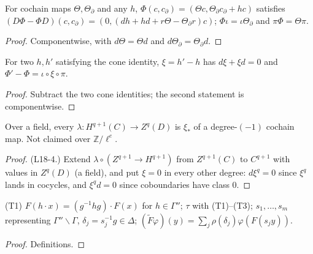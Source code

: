 \begin{lemma}\label{lem:conesign}
  \leanok
  For cochain maps $\Theta,\Theta_\partial$ and any $h$, $\Phi(c,c_\partial)=(\Theta c,\Theta_\partial c_\partial+hc)$ satisfies
  $(D\Phi-\Phi D)(c,c_\partial)=(0,(dh+hd+r\Theta-\Theta_\partial r)c)$; $\Phi\iota=\iota\Theta_\partial$ and $\pi\Phi=\Theta\pi$.
\end{lemma}
\begin{proof}
  \leanok
  Componentwise, with $d\Theta=\Theta d$ and $d\Theta_\partial=\Theta_\partial d$.
\end{proof}

\begin{proposition}\label{prop:coneambiguity}
  \leanok
  For two $h,h'$ satisfying the cone identity, $\xi=h'-h$ has $d\xi+\xi d=0$ and $\Phi'-\Phi=\iota\circ\xi\circ\pi$.
\end{proposition}
\begin{proof}
  \leanok
  Subtract the two cone identities; the second statement is componentwise.
\end{proof}

\begin{proposition}\label{prop:coneambiguity-realise}
  \leanok
  Over a field, every $\lambda\colon H^{q+1}(C)\to Z^q(D)$ is $\xi_*$ of a degree-$(-1)$ cochain map. Not claimed over
  $\mathbb Z/\ell^e$.
\end{proposition}
\begin{proof}
  \leanok
  (L18-4.) Extend $\lambda\circ(Z^{q+1}\to H^{q+1})$ from $Z^{q+1}(C)$ to $C^{q+1}$ with values in $Z^q(D)$ (a field), and
  put $\xi=0$ in every other degree: $d\xi^q=0$ since $\xi^q$ lands in cocycles, and $\xi^q d=0$ since coboundaries have
  class $0$.
\end{proof}

\begin{definition}\label{def:cosettransport}
  \leanok
  (T1) $F(h\cdot x)=(g^{-1}hg)\cdot F(x)$ for $h\in\Gamma''$; $\tau$ with (T1)--(T3); $s_1,\dots,s_m$ representing
  $\Gamma''\backslash\Gamma$, $\delta_j=s_j^{-1}g\in\Delta$; $(\widetilde F\varphi)(y)=\sum_j\rho(\delta_j)\varphi(F(s_j y))$.
\end{definition}
\begin{proof}
  \leanok
  Definitions.
\end{proof}

